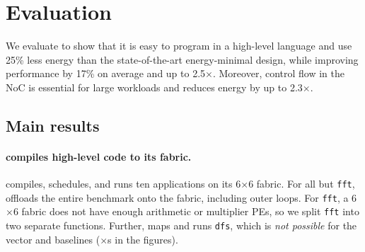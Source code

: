 \section{Evaluation}
\label{sec:eval}

\figRipTideEnergyResults

\figRipTidePerformanceResults

We evaluate \riptide to show that it is easy to program in a high-level language
and use 25\% less energy than the state-of-the-art energy-minimal design,
while improving performance by 17\% on average and up to 2.5$\times$.
Moreover, control flow in the NoC is essential for large
workloads and reduces energy by up to 2.3$\times$. %


\subsection{Main results}

\paragraph{\riptide compiles high-level code to its fabric.} \riptide
compiles, schedules, and runs ten applications on its 6$\times$6 fabric.
% 
For all but {\tt fft}, \riptide offloads the entire benchmark onto the fabric, including
outer loops.
% 
For {\tt fft}, a 6$\times$6 fabric does not have enough arithmetic or multiplier PEs,
so we split {\tt fft} into two separate functions. %
% 
Further, \riptide maps and runs {\tt dfs}, which is {\em not possible} for
the vector and \snafu baselines ($\times$s in the figures).

